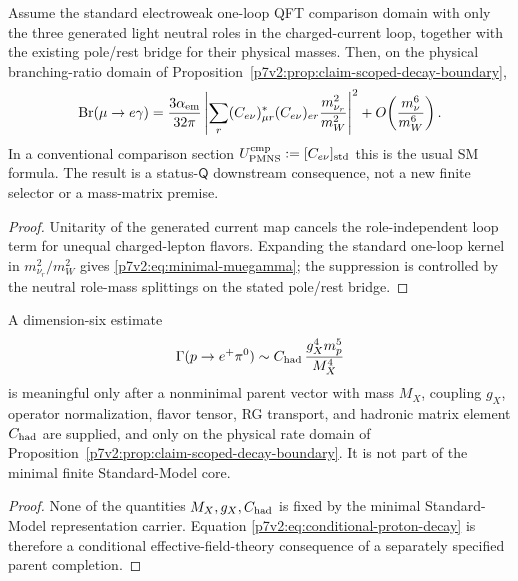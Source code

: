 \documentclass[11pt,a4paper]{article}
\begin{document}
\begin{proposition}
\label{p7v2:prop:minimal-lfv}
Assume the standard electroweak one-loop QFT comparison domain with only the
three generated light neutral roles in the charged-current loop, together
with the existing pole/rest bridge for their physical masses.  Then, on the
physical branching-ratio domain of
Proposition~\ref{p7v2:prop:claim-scoped-decay-boundary},
\begin{equation}
\label{p7v2:eq:minimal-muegamma}
 {\rm Br}(\mu\to e\gamma)
 =
 \frac{3\alpha_{\rm em}}{32\pi}
 \left|
   \sum_r (C_{e\nu})_{\mu r}^{*}(C_{e\nu})_{er}
   \frac{m_{\nu_r}^2}{m_W^2}
 \right|^2
 +O\!\left(\frac{m_\nu^6}{m_W^6}\right).
\end{equation}
In a conventional comparison section
$U_{\rm PMNS}^{\rm cmp}:=[C_{e\nu}]_{\rm std}$ this is the usual SM formula.
The result is a status-\(\mathsf Q\) downstream consequence, not a new finite
selector or a mass-matrix premise.
\end{proposition}

\begin{proof}
Unitarity of the generated current map cancels the role-independent loop term
for unequal charged-lepton flavors.  Expanding the standard one-loop kernel in
$m_{\nu_r}^2/m_W^2$ gives \eqref{p7v2:eq:minimal-muegamma}; the suppression is
controlled by the neutral role-mass splittings on the stated pole/rest bridge.
\end{proof}

\begin{proposition}
\label{p7v2:prop:conditional-proton-decay}
A dimension-six estimate
\begin{equation}
\label{p7v2:eq:conditional-proton-decay}
 \Gamma(p\to e^+\pi^0)
 \sim
 C_{\rm had}\,\frac{g_X^4m_p^5}{M_X^4}
\end{equation}
is meaningful only after a nonminimal parent vector with mass \(M_X\),
coupling \(g_X\), operator normalization, flavor tensor, RG transport, and
hadronic matrix element \(C_{\rm had}\) are supplied, and only on the physical
rate domain of Proposition~\ref{p7v2:prop:claim-scoped-decay-boundary}.  It is
not part of the minimal finite Standard-Model core.
\end{proposition}

\begin{proof}
None of the quantities \(M_X,g_X,C_{\rm had}\) is fixed by the minimal
Standard-Model representation carrier.  Equation
\eqref{p7v2:eq:conditional-proton-decay} is therefore a conditional
effective-field-theory consequence of a separately specified parent
completion.
\end{proof}
\end{document}
